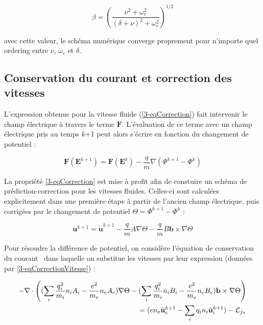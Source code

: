 \begin{refsection}
\begin{equation}
\label{3-eqMvtPonderee}
\beta=\left(\frac{\nu^2+\omega_c^2}{(\delta+\nu)^2+\omega_c^2}\right)^{1/2}
\end{equation}

avec cette valeur, le schéma numérique converge proprement pour n'importe quel
ordering entre $\nu$, $\omega_c$ et $\delta$.


\subsection{Conservation du courant et correction des vitesses}

L'expression obtenue pour la vitesse
fluide (\eqref{3-eqCorrection}) fait intervenir le champ électrique à travers le
terme $\mathbf F$.
L'évaluation de ce terme avec un champ électrique pris au temps $k$+1 peut alors
s'écrire en fonction du changement de potentiel :

\begin{equation}
\label{3-eqCorrection}
\mathbf F(\mathbf E^{k+1}) = \mathbf F(\mathbf E^{k})-\frac{q}{m}\nabla
(\Phi^{k+1}-\Phi^{k})
\end{equation}

La propriété \eqref{3-eqCorrection} est mise à profit afin de constuire un
schéma de prédiction-correction pour les vitesses fluides. Celles-ci sont
calculées explicitement dans une première étape à partir de l'ancien champ électrique,
puis corrigées par le changement de potentiel
$\Theta=\Phi^{k+1}-\Phi^k$ :

\begin{equation}
\label{3-eqCorrectionVitesse}
\mathbf u^{k+1} = \tilde{\mathbf u}^{k+1}-\frac{q}{m}A\nabla
\Theta-\frac{q}{m}B\mathbf b\times\nabla
\Theta
\end{equation}

Pour résoudre la différence de potentiel, on considère l'équation de
conservation du courant~ dans laquelle on substitue les
vitesses par leur expression (données par \eqref{3-eqCorrectionVitesse}) :

\begin{equation}
\begin{split}
\label{3-eqCourantCoefficient}
-\nabla\cdot\left((\sum_i\frac{q_i^2}{m_i}n_iA_i-\frac{e^2}{m_e}n_eA_e)\nabla
\Theta-(\sum_i\frac{q_i^2}{m_i}n_iB_i-\frac{e^2}{m_e}n_eB_e)\mathbf
b\times\nabla
\Theta\right)\\=(en_e\tilde{\mathbf
u}_e^{k+1}-\sum_iq_in_i\tilde{\mathbf u}_i^{k+1})-\mathcal L_{j_\para}
\end{split}
\end{equation}


\end{refsection}
